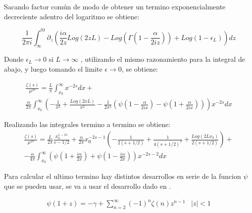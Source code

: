 Sacando factor común de modo de obtener un termino exponencialmente decreciente adentro del logaritmo se obtiene:

\begin{equation}
\frac{ 1 }{2 \pi i}  \int _{\infty} ^{t0} 
\partial _{z}
\left(
\frac{i\alpha}{2 z} Log ( 2 z L ) - 
Log \left( \Gamma \left( 1 - \frac{ \alpha}{2 i z} \right) \right) +
Log \left( 1- \epsilon _L \right)
\right)
d z
\end{equation}

Donde $ \epsilon _L \rightarrow 0$ si $L \rightarrow \infty $ , utilizando el mismo razonamiento para la integral de abajo, y luego tomando el limite $\epsilon \rightarrow 0$, se obtiene:

\begin{equation}
\begin{array}{c}
\frac{\zeta (s)}{\mu ^{2s}} = 
\frac{L }{\pi}
\int _ {x_0} ^{\infty} x ^{-2s} dx + \\[10pt]
\frac{\alpha }{2 \pi } \int _{x_0} ^{\infty} 
\left(-
\frac{1}{ x ^2} +
\frac{Log \left( 2 x L \right) }{x ^2}  -
\frac{1}{ 2 x ^2 } 
\left(
\psi (1 - \frac{ \alpha}{2 i x}) - \psi (1 + \frac{ \alpha}{2 i x}) 
\right)
\right)
x ^{-2s} d x
\end{array}
\end{equation}



Realizando las integrales termino a termino se obtiene:
\begin{equation}
\begin{array}{c}
\frac{\zeta (s)}{\mu ^{2s}} = 


\frac{L  }{2 \pi} \frac{x _0 ^{1-2s}}{s-1/2} + 


\frac{\alpha  }{2 \pi} x _{0} ^{-2s-1}
\left( 
	-\frac{1}{2(s+1/2)} +
	\frac{1}{4 (s+1/2) ^2} +
	\frac{Log(2 L x _0)}{2(s+1/2)} 
	\right) + 

  \\[10pt]


- \frac{\alpha  }{4 \pi}
\int _{x_0} ^{\infty} 
\left(
\psi(1 + \frac{i \alpha}{2 x}) +
\psi(1 - \frac{i \alpha}{2 x} )
\right)
x ^{-2s-2}
dx
\end{array}
\end{equation}


Para calcular el ultimo termino hay distintos desarrollos en serie de la funcion $\psi $ que se pueden usar, se va a usar el desarrollo dado en \cite{Abramowitz:1974:HMF:1098650}.

\begin{equation}
\begin{array}{cc}
\psi (1+ z ) = - \gamma + \sum _{n=2} ^{\infty} (-1) ^n \zeta (n) z ^{n-1} & |z| < 1
\end{array}
\label{repr}
\end{equation}


